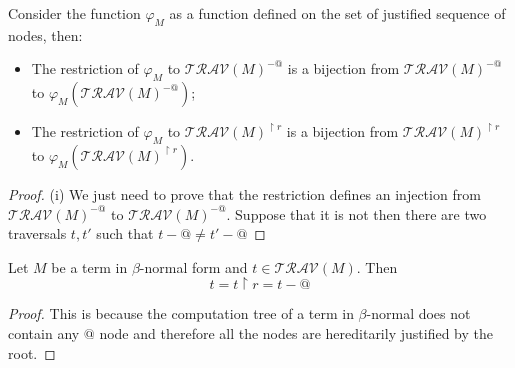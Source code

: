 \begin{lem}
Consider the function $\varphi_M$ as a function defined on the set
of justified sequence of nodes, then:
\begin{itemize}
\item[(i)] The restriction of $\varphi_M$ to $\mathcal{TRAV}(M)^{-@}$ is a
bijection from $\mathcal{TRAV}(M)^{-@}$ to
$\varphi_M(\mathcal{TRAV}(M)^{-@})$;
\item[(ii)] The restriction of $\varphi_M$ to $\mathcal{TRAV}(M)^{\upharpoonright r}$ is a
bijection from $\mathcal{TRAV}(M)^{\upharpoonright r}$ to
$\varphi_M(\mathcal{TRAV}(M)^{\upharpoonright r})$.
\end{itemize}
\end{lem}
\begin{proof}
(i) We just need to prove that the restriction defines an injection
from $\mathcal{TRAV}(M)^{-@}$ to $\mathcal{TRAV}(M)^{-@}$. Suppose
that it is not then there are two traversals $t,t'$ such that $t-@
\neq t'-@$


\end{proof}



\begin{lem}
Let $M$ be a term in $\beta$-normal form and $t \in \mathcal{TRAV}(M)$. Then
$$t = t \upharpoonright r = t - @$$
\end{lem}
\begin{proof}
This is because the computation tree of a term in $\beta$-normal does not contain any $@$ node
and therefore all the nodes are hereditarily justified by the root.
\end{proof}




